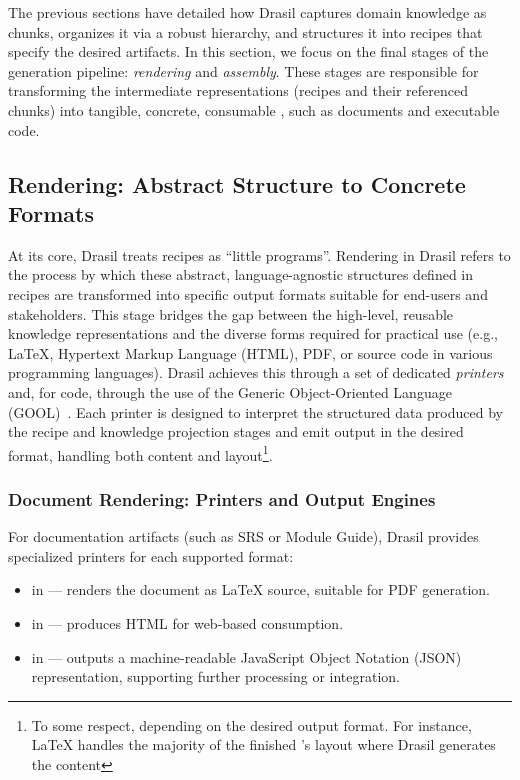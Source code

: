 The previous sections have detailed how Drasil captures domain knowledge as 
chunks, organizes it via a robust hierarchy, and structures it into recipes 
that specify the desired artifacts. In this section, we focus on the final 
stages of the generation pipeline: \emph{rendering} and \emph{assembly}. These 
stages are responsible for transforming the intermediate representations 
(recipes and their referenced chunks) into tangible, concrete, consumable 
\sfs{}, such as documents and executable code.

\subsection{Rendering: 
Abstract Structure to Concrete Formats}

At its core, Drasil treats recipes as ``little programs''. Rendering in Drasil
refers to the process by which these abstract, language-agnostic structures 
defined in recipes are transformed into specific output formats suitable for 
end-users and stakeholders. This stage bridges the gap between the high-level, 
reusable knowledge representations and the diverse forms required for practical
use (e.g., \LaTeX{}, Hypertext Markup Language (HTML), PDF, or source code in
various programming languages). Drasil achieves this through a set of dedicated
\emph{printers}
and, for code, through the use of the Generic Object-Oriented Language 
(GOOL)~\citep{Costabile2012, Carette2020GOOL}. Each printer is designed to
interpret the structured data produced by the recipe and knowledge projection 
stages and emit output in the desired format, handling both content and 
layout\footnote{To some respect, depending on the desired output format. For 
instance, \LaTeX{} handles the majority of the finished \sf{}'s layout where 
Drasil generates the content}.

\subsubsection{Document Rendering: Printers and Output Engines}
For documentation artifacts (such as SRS or Module Guide), Drasil provides 
specialized printers for each supported format:
\begin{itemize}
    \item {} in  --- renders the 
    document as \LaTeX{} source, suitable for PDF generation.
    \item {} in  --- produces 
    HTML for web-based consumption.
    \item {} in  --- outputs a
    machine-readable JavaScript Object Notation (JSON) representation,
    supporting further processing or integration.
\end{itemize}


